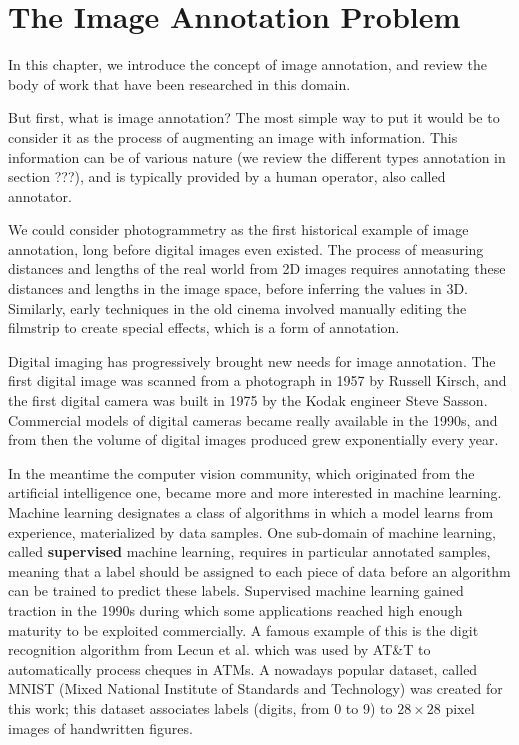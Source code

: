\chapter{The Image Annotation Problem}%
\label{cha:the_image_annotation_problem}

\adjustmtc
\minitoc%

In this chapter, we introduce the concept of image annotation, and review the body of work that have been researched in this domain. 

But first, what is image annotation? The most simple way to put it would be to consider it as the process of augmenting an image with information. This information can be of various nature (we review the different types annotation in section ???), and is typically provided by a human operator, also called annotator. 

We could consider photogrammetry as the first historical example of image annotation, long before digital images even existed. The process of measuring distances and lengths of the real world from 2D images requires annotating these distances and lengths in the image space, before inferring the values in 3D. Similarly, early techniques in the old cinema involved manually editing the filmstrip to create special effects, which is a form of annotation.

Digital imaging has progressively brought new needs for image annotation. The first digital image was scanned from a photograph in 1957 by Russell Kirsch, and the first digital camera was built in 1975 by the Kodak engineer Steve Sasson. Commercial models of digital cameras became really available in the 1990s, and from then the volume of digital images produced grew exponentially every year.

In the meantime the computer vision community, which originated from the artificial intelligence one, became more and more interested in machine learning. Machine learning designates a class of algorithms in which a model learns from experience, materialized by data samples. One sub-domain of machine learning, called \textbf{supervised} machine learning, requires in particular annotated samples, meaning that a label should be assigned to each piece of data before an algorithm can be trained to predict these labels. Supervised machine learning gained traction in the 1990s during which some applications reached high enough maturity to be exploited commercially. A famous example of this is the digit recognition algorithm from Lecun et al. \cite{blabla} which was used by AT\&T to automatically process cheques in ATMs. A nowadays popular dataset, called MNIST (Mixed National Institute of Standards and Technology) was created for this work; this dataset associates labels (digits, from 0 to 9) to $28\times 28$ pixel images of handwritten figures. 

